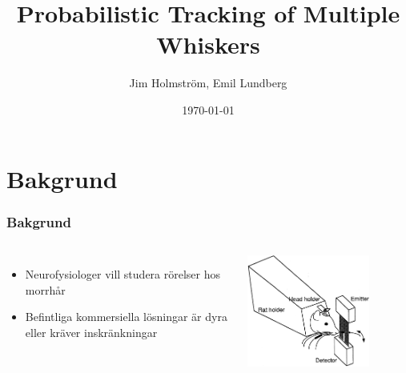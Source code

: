 \documentclass[]{beamer}
\title{Probabilistic Tracking of Multiple Whiskers}
\author{Jim Holmstr\"{o}m, Emil Lundberg}                 %
\institute{CSC,KTH}      %
\date{\today}                    %
\renewcommand{\ae}{\"{a}}
\renewcommand{\oe}{\"{o}}
\begin{document}
\begin{frame}
  \titlepage
\end{frame}


\section{Bakgrund}
\begin{frame}
  \frametitle{Bakgrund}
  \begin{columns}[c]
    \column{2in}
    \begin{itemize}
    \item Neurofysiologer vill studera rörelser hos morrh\aa r
    \item Befintliga kommersiella l\oe sningar \ae r dyra eller kr\ae ver inskr\ae nkningar
    \end{itemize}
    \column{2in}
    \includegraphics[width=0.75\textwidth]{optoelectronic.png}
  \end{columns}
\end{frame}

\section[Agenda]{}

\begin{frame}
  \tableofcontents
\end{frame}
\end{document}
